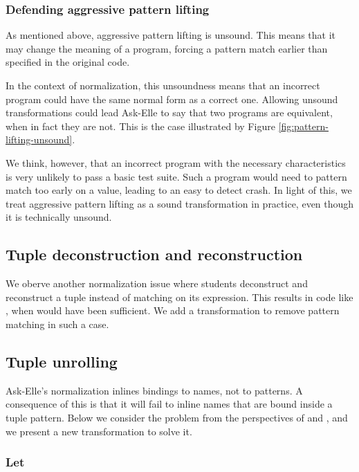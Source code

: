 \subsubsection{Defending aggressive pattern lifting}

As mentioned above, aggressive pattern lifting is unsound. This means that it may change the meaning of a program, forcing a pattern match earlier than specified in the original code.

In the context of normalization, this unsoundness means that an incorrect program could have the same normal form as a correct one. Allowing unsound transformations could lead Ask-Elle to say that two programs are equivalent, when in fact they are not. This is the case illustrated by Figure \ref{fig:pattern-lifting-unsound}.

We think, however, that an incorrect program with the necessary characteristics is very unlikely to pass a basic test suite. Such a program would need to pattern match too early on a value, leading to an easy to detect crash. In light of this, we treat aggressive pattern lifting as a sound transformation in practice, even though it is technically unsound.


\subsection{Tuple deconstruction and reconstruction}

We oberve another normalization issue where students deconstruct and reconstruct a tuple instead of matching on its expression. This results in code like , when  would have been sufficient. We add a transformation to remove pattern matching in such a case.

\subsection{Tuple unrolling}

Ask-Elle's normalization inlines bindings to names, not to patterns. A consequence of this is that it will fail to inline names that are bound inside a tuple pattern. Below we consider the problem from the perspectives of  and , and we present a new transformation to solve it.

\subsubsection{Let}

